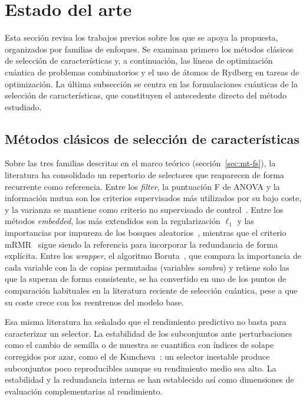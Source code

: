 \section{Estado del arte}
\label{sec:mt-estado-arte}

Esta sección revisa los trabajos previos sobre los que se apoya la
propuesta, organizados por familias de enfoques. Se examinan primero
los métodos clásicos de selección de características y, a continuación,
las líneas de optimización cuántica de problemas combinatorios y el uso
de átomos de Rydberg en tareas de optimización. La última subsección se
centra en las formulaciones cuánticas de la selección de
características, que constituyen el antecedente directo del método
estudiado.

\subsection{Métodos clásicos de selección de características}

Sobre las tres familias descritas en el marco teórico
(sección~\ref{sec:mt-fs}), la literatura ha consolidado un repertorio de
selectores que reaparecen de forma
recurrente como referencia. Entre los \emph{filter}, la puntuación F de ANOVA
y la información mutua son los criterios supervisados más utilizados por
su bajo coste, y la varianza se mantiene como criterio no supervisado de
control~\cite{solorio2020}. Entre los métodos \emph{embedded}, los más
extendidos son la regularización $\ell_1$ y las importancias por
impureza de los bosques aleatorios~\cite{breiman2001}, mientras que el
criterio mRMR~\cite{peng2005} sigue siendo la referencia para incorporar
la redundancia de forma explícita. Entre los \emph{wrapper}, el algoritmo
Boruta~\cite{kursa2010}, que compara la importancia de cada variable con
la de copias permutadas (variables \textit{sombra}) y retiene solo las
que la superan de forma consistente, se ha convertido en uno de los
puntos de comparación habituales en la literatura reciente de selección
cuántica, pese a que su coste crece con los reentrenos del modelo base.

Esa misma literatura ha señalado que el rendimiento predictivo no basta
para caracterizar un selector. La estabilidad de los subconjuntos ante
perturbaciones como el cambio de semilla o de muestra se cuantifica con
índices de solape corregidos por azar, como el de
Kuncheva~\cite{kuncheva2007}: un selector inestable produce subconjuntos
poco reproducibles aunque su rendimiento medio sea alto. La estabilidad
y la redundancia interna se han establecido así como dimensiones de
evaluación complementarias al rendimiento.

